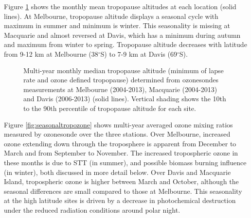     Figure \ref{fig:seasonaltpheights} shows the monthly mean tropopause altitudes at each location (solid lines).
    At Melbourne, tropopause altitude displays a seasonal cycle with maximum in summer and minimum is winter.
    This seasonality is missing at Macquarie and almost reversed at Davis, which has a minimum during autumn and maximum from winter to spring.
    Tropopause altitude decreases with latitude from 9-12 km at Melbourne (38$^\circ$S) to 7-9 km at Davis (69$^\circ$S).

    \begin{figure}[t] 
      \caption{%
	Multi-year monthly median tropopause altitude (minimum of lapse rate and ozone defined tropopause) determined from ozonesondes measurements at Melbourne (2004-2013), Macquarie (2004-2013) and Davis (2006-2013) (solid lines).
	Vertical shading shows the 10th to the 90th percentile of tropopause altitude for each site.}
      \label{fig:seasonaltpheights}
    \end{figure}

    Figure \ref{fig:seasonaltropozone} shows multi-year averaged ozone mixing ratios measured by ozonesonde over the three stations.
    Over Melbourne, increased ozone extending down through the troposphere is apparent from December to March and from September to November.
    The increased tropospheric ozone in these months is due to STT (in summer), and possible biomass burning influence (in winter), both discussed in more detail below.
    Over Davis and Macquarie Island, tropospheric ozone is higher between March and October, although the seasonal differences are small compared to those at Melbourne.
    This seasonality at the high latitude sites is driven by a decrease in photochemical destruction under the reduced radiation conditions around polar night. %
    
    \begin{figure*}[t]
      \caption{ %
	Multi-year mean seasonal cycle of ozone mixing ratio over Davis, Macquarie, and Melbourne as measured by ozonesondes.
	Measurements were interpolated to every 100~m and then binned monthly.
	Black and red solid lines show median ozone and lapse-rate defined tropopause altitudes (respectively), defined as described in the text. }
      \label{fig:seasonaltropozone}
    \end{figure*}

